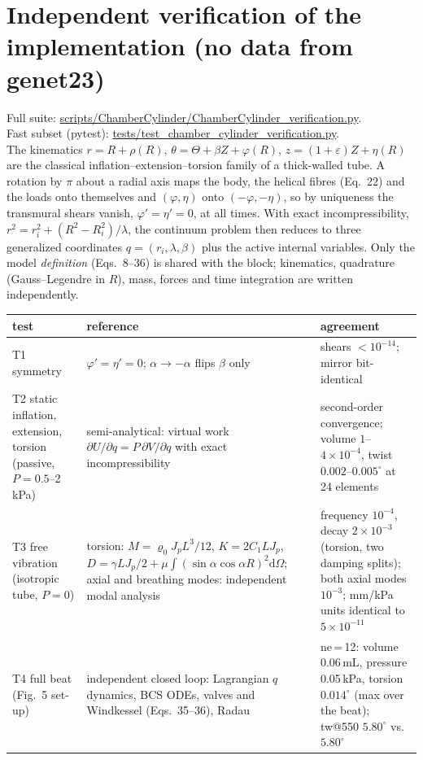 \documentclass[10pt]{article}
\begin{document}
\section*{Independent verification of the implementation (no data from genet23)}
Full suite: \url{scripts/ChamberCylinder/ChamberCylinder_verification.py}.\\
Fast subset (pytest): \url{tests/test_chamber_cylinder_verification.py}.\\
The kinematics $r=R+\rho(R)$,
$\theta=\Theta+\beta Z+\varphi(R)$, $z=(1+\varepsilon)Z+\eta(R)$ are the classical
inflation--extension--torsion family of a thick-walled tube. A rotation by $\pi$ about a radial
axis maps the body, the helical fibres (Eq.~22) and the loads onto themselves and $(\varphi,\eta)$
onto $(-\varphi,-\eta)$, so by uniqueness the transmural shears vanish, $\varphi'=\eta'=0$, at all
times. With exact incompressibility, $r^2=r_i^2+(R^2-R_i^2)/\lambda$, the continuum problem then
reduces to three generalized coordinates $q=(r_i,\lambda,\beta)$ plus the active internal
variables. Only the model \emph{definition} (Eqs.~8--36) is shared with the block; kinematics,
quadrature (Gauss--Legendre in $R$), mass, forces and time integration are written independently.
\begin{center}\small\begin{tabular}{P{3.2cm}P{6.0cm}P{6.0cm}}
\toprule
test & reference & agreement \\ \midrule
T1 symmetry & $\varphi'=\eta'=0$; $\alpha\to-\alpha$ flips $\beta$ only & shears $<10^{-14}$; mirror bit-identical \\
T2 static inflation, extension, torsion (passive, $P=0.5$--2\,kPa) & semi-analytical: virtual work
$\partial U/\partial q=P\,\partial V/\partial q$ with exact incompressibility & second-order
convergence; volume $1$--$4\times10^{-4}$, twist $0.002$--$0.005^\circ$ at 24 elements \\
T3 free vibration (isotropic tube, $P=0$) & torsion: $M=\varrho_0J_pL^3/12$, $K=2C_1LJ_p$,
$D=\gamma LJ_p/2+\mu\!\int(\sin\alpha\cos\alpha R)^2\mathrm d\Omega$; axial and breathing modes:
independent modal analysis & frequency $10^{-4}$, decay $2\times10^{-3}$ (torsion, two damping
splits); both axial modes $10^{-3}$; mm/kPa units identical to $5\times10^{-11}$ \\
T4 full beat (Fig.~5 set-up) & independent closed loop: Lagrangian $q$ dynamics, BCS ODEs, valves
and Windkessel (Eqs.~35--36), Radau & ne\,=\,12: volume 0.06\,mL, pressure 0.05\,kPa, torsion
$0.014^\circ$ (max over the beat); tw@550 $5.80^\circ$ vs.\ $5.80^\circ$ \\ \bottomrule
\end{tabular}\end{center}
\end{document}
